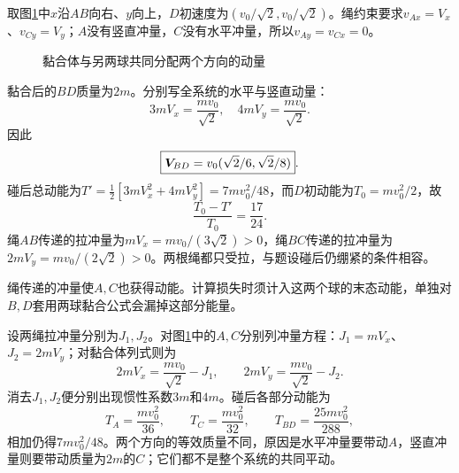 \begin{solution}
取图\ref{fig:hw5-5-s}中$x$沿$AB$向右、$y$向上，$D$初速度为$(v_0/\sqrt2,v_0/\sqrt2)$。绳约束要求$v_{Ax}=V_x$、$v_{Cy}=V_y$；$A$没有竖直冲量，$C$没有水平冲量，所以$v_{Ay}=v_{Cx}=0$。

\begin{figure}[H]\centering
{}
\caption{黏合体与另两球共同分配两个方向的动量}\label{fig:hw5-5-s}
\end{figure}

黏合后的$BD$质量为$2m$。分别写全系统的水平与竖直动量：
\[
 3mV_x=\frac{mv_0}{\sqrt2},\quad
 4mV_y=\frac{mv_0}{\sqrt2}.
\]
因此
\[
 \boxed{\bm{V}_{BD}=v_0(\sqrt2/6,\sqrt2/8)}.
\]
碰后总动能为$T'=\tfrac12[3mV_x^2+4mV_y^2]=7mv_0^2/48$，而$D$初动能为$T_0=mv_0^2/2$，故
\[
 \boxed{\frac{T_0-T'}{T_0}=\frac{17}{24}}.
\]
绳$AB$传递的拉冲量为$mV_x=mv_0/(3\sqrt2)>0$，绳$BC$传递的拉冲量为$2mV_y=mv_0/(2\sqrt2)>0$。两根绳都只受拉，与题设碰后仍绷紧的条件相容。

绳传递的冲量使$A,C$也获得动能。计算损失时须计入这两个球的末态动能，单独对$B,D$套用两球黏合公式会漏掉这部分能量。


设两绳拉冲量分别为$J_1,J_2$。对图\ref{fig:hw5-5-s}中的$A,C$分别列冲量方程：$J_1=mV_x$、$J_2=2mV_y$；对黏合体列式则为
\[
 2mV_x=\frac{mv_0}{\sqrt2}-J_1,\qquad
 2mV_y=\frac{mv_0}{\sqrt2}-J_2.
\]
消去$J_1,J_2$便分别出现惯性系数$3m$和$4m$。碰后各部分动能为
\[
 T_A=\frac{mv_0^2}{36},\qquad
 T_C=\frac{mv_0^2}{32},\qquad
 T_{BD}=\frac{25mv_0^2}{288},
\]
相加仍得$7mv_0^2/48$。两个方向的等效质量不同，原因是水平冲量要带动$A$，竖直冲量则要带动质量为$2m$的$C$；它们都不是整个系统的共同平动。

\end{solution}



